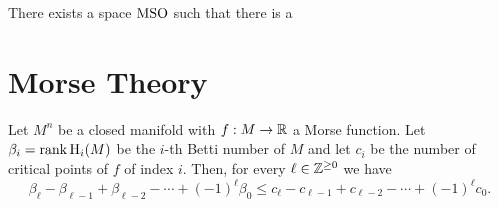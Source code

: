 \begin{theorem}
  There exists a space $\mathrm{MSO}$ such that there is a 
\end{theorem}

\section{Morse Theory}\label{sec:morse-theory}

\begin{theorem}
	Let $M^n$ be a closed manifold with $f : M\to \mathbb{R}$ a Morse function. Let $\beta_i=\operatorname{rank} \operatorname{H}_i(M)$ be the $i$-th Betti number of $M$ and let $c_i$ be the number of critical points of $f$ of index $i$. Then, for every $\ell\in \mathbb{Z}^{\geq 0}$ we have
	\[
		\beta_\ell - \beta_{\ell-1} + \beta_{\ell-2} - \cdots +(-1)^\ell \beta_0 \leq c_\ell - c_{\ell-1} + c_{\ell-2} - \cdots + (-1)^\ell c_0.
	\]
\end{theorem}
